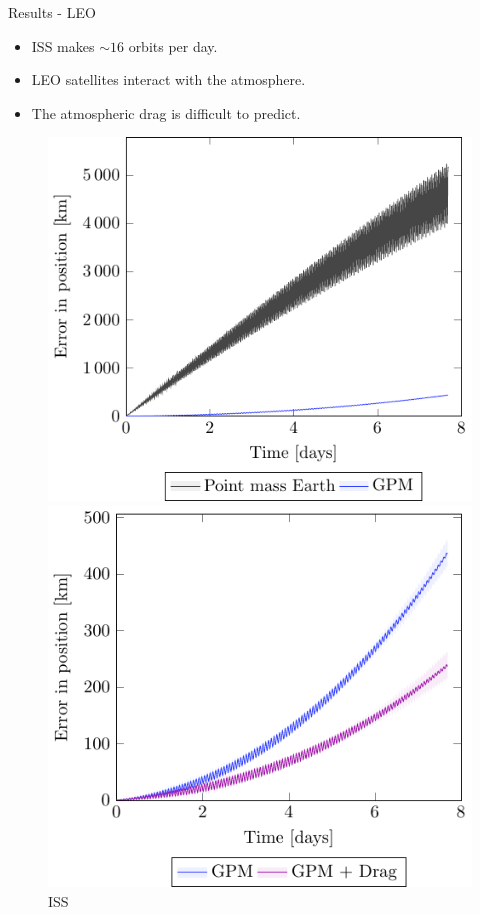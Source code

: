 \documentclass{beamer} %
\begin{document}
\begin{frame}{Results - LEO}
  \begin{itemize}
    \item ISS makes $\sim 16$ orbits per day.
    \item LEO satellites interact with the atmosphere.
    \item The atmospheric drag is difficult to predict.
  \end{itemize}
  \begin{figure}[htbp]
    \centering
    \begin{minipage}[ht]{0.45\textwidth}
      \centering
      \includegraphics[width=\textwidth]{../Images/simulation/ISS_pointMass_comparison.pdf}
      \caption{\hspace{0.8cm}ISS}
    \end{minipage}
    \hspace{0.0333333\textwidth}
    \begin{minipage}[ht]{0.45\textwidth}
      \centering
      \includegraphics[width=\textwidth]{../Images/simulation/ISS.pdf}

\end{minipage}
\end{figure}
\end{frame}
\end{document}
